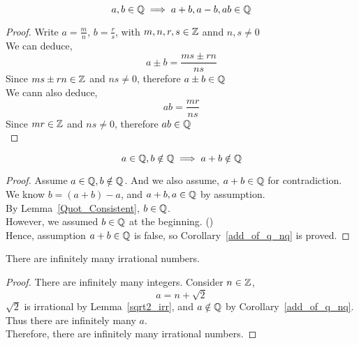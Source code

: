 \documentclass[a4paper]{article}
\begin{document}
\begin{nlemma}\label{Quot_Consistent}
$$a,b \in \mathbb{Q} \implies a+b, a-b, ab \in \mathbb{Q}$$
\end{nlemma}
\begin{proof}
Write $a = \frac{m}{n}$, $b = \frac{r}{s}$, with $m,n,r,s \in \mathbb{Z}$ annd $n,s \neq 0$\\
We can deduce, $$a \pm b = \frac{ms \pm rn}{ns}$$
Since $ms \pm rn \in \mathbb{Z}$ and $ns \neq 0$, therefore $a \pm b \in \mathbb{Q}$\\
We cann also deduce, $$ab = \frac{mr}{ns}$$
Since $mr \in \mathbb{Z}$ and $ns \neq 0$, therefore $ab \in \mathbb{Q}$\\
\end{proof}

\begin{ncor}\label{add_of_q_nq}
$$a \in \mathbb{Q}, b \notin \mathbb{Q} \implies a + b \notin \mathbb{Q}$$
\end{ncor}
\begin{proof}
Assume $a \in \mathbb{Q}, b \notin \mathbb{Q}$. And we also assume, $a + b \in \mathbb{Q}$ for contradiction.\\
We know $b = (a + b) - a$, and $a+b, a \in \mathbb{Q}$ by assumption.\\
By Lemma~\ref{Quot_Consistent}, $b \in \mathbb{Q}$.\\
However, we assumed $b \in \mathbb{Q}$ at the beginning. (\contradiction)\\
Hence, assumption $a + b \in \mathbb{Q}$ is false, so Corollary~\ref{add_of_q_nq} is proved.
\end{proof}

\begin{ncor}\label{inf_irr_num}
There are infinitely many irrational numbers.
\end{ncor}
\begin{proof}
There are infinitely many integers.
Consider $n \in \mathbb{Z}$, $$a = n + \sqrt{2}$$
$\sqrt{2}$ is irrational by Lemma~\ref{sqrt2_irr}, and $a \notin \mathbb{Q}$ by Corollary~\ref{add_of_q_nq}.\\
Thus there are infinitely many $a$.\\
Therefore, there are infinitely many irrational numbers.
\end{proof}
\end{document}
